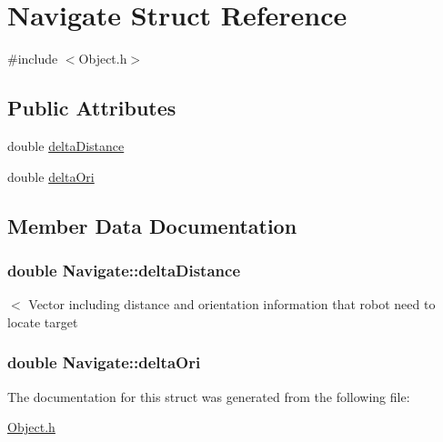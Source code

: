 \hypertarget{structNavigate}{\section{Navigate Struct Reference}
\label{structNavigate}
}


{\ttfamily \#include $<$Object.\-h$>$}

\subsection*{Public Attributes}
\begin{DoxyCompactItemize}
\item 
double \hyperlink{structNavigate_a44093df3edad183c340d85d9762a27f8}{delta\-Distance}
\item 
double \hyperlink{structNavigate_a245fd5044011a7d7d8471e52771bf4b3}{delta\-Ori}
\end{DoxyCompactItemize}


\subsection{Member Data Documentation}
\hypertarget{structNavigate_a44093df3edad183c340d85d9762a27f8}{
\subsubsection[{delta\-Distance}]{\setlength{\rightskip}{0pt plus 5cm}double Navigate\-::delta\-Distance}}\label{structNavigate_a44093df3edad183c340d85d9762a27f8}
$<$ Vector including distance and orientation information that robot need to locate target \hypertarget{structNavigate_a245fd5044011a7d7d8471e52771bf4b3}{
\subsubsection[{delta\-Ori}]{\setlength{\rightskip}{0pt plus 5cm}double Navigate\-::delta\-Ori}}\label{structNavigate_a245fd5044011a7d7d8471e52771bf4b3}


The documentation for this struct was generated from the following file\-:\begin{DoxyCompactItemize}
\item 
\hyperlink{Object_8h}{Object.\-h}\end{DoxyCompactItemize}
